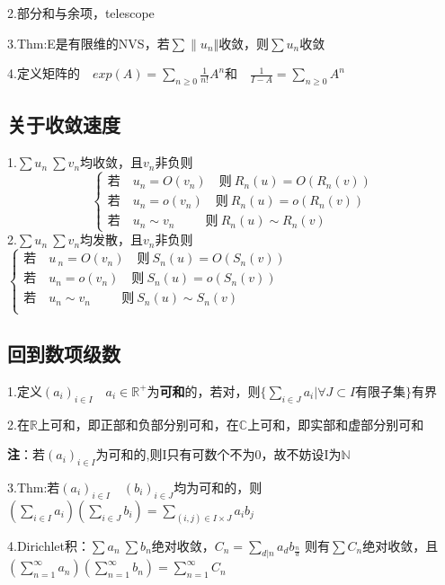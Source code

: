 \documentclass[hyperfer,UTF8,a4paper,12pt]{article}
\theoremstyle{plain}
\begin{document}
    2.部分和与余项，telescope

    3.Thm:E是有限维的NVS，若$\sum\|u_n\Vert$收敛，则$ \sum u_n $收敛

    4.定义矩阵的$\quad exp(A)=\sum\limits_{n\ge 0} \frac{1}{n!}A^n$和$\quad \frac{1}{I-A}=\sum\limits_{n\ge 0}A^n $


\subsection{关于收敛速度}
1.$ \sum u_n\ \sum v_n $均收敛，且$ v_n $非负则
\[\begin{cases}
 \textrm{若}\quad u_n=O(v_n) \quad\textrm{则} \ R_n(u)=O(R_n(v))  \\

 \textrm{若}\quad u_n=o(v_n) \quad\textrm{则} \ R_n(u)=o(R_n(v)) \\

 \textrm{若}\quad u_n\sim v_n\ \ \qquad\textrm{则} \ R_n(u)\sim R_n(v)
\end{cases}
\]
2.$ \sum u_n\ \sum v_n $均发散，且$ v_n $非负则
$\begin{cases}
\textrm{若}\quad u\,_n=O(v_n)   \quad\textrm{则}  \ S_n(u)=O(S_n(v))\\
\textrm{若}\quad u_n=o(v_n)     \quad\textrm{则}  \ S_n(u)=o(S_n(v))\\
\textrm{若}\quad u_n\sim v_n\ \ \qquad\textrm{则} \ S_n(u)\sim S_n(v)\\
\end{cases}$

\subsection{回到数项级数}
1.定义$ (a_i)_{i\in I}\quad a_i\in \mathbb{R}^+ $为\textbf{可和}的，若对，则$ \{\sum\limits_{i\in J} a_i|\forall J\subset I\textrm{有限子集}\}$有界

2.在$ \mathbb{R} $上可和，即正部和负部分别可和，在$ \mathbb{C} $上可和，即实部和虚部分别可和

\textbf{注}：若$ (a_i)_{i\in I} $为可和的,则I只有可数个不为0，故不妨设I为$\mathbb{N}$

3.Thm:若$ (a_i)_{i\in I} \quad (b_i)_{i\in J} $均为可和的，则$ (\sum\limits_{i\in I} a_i )(\sum\limits_{i\in J} b_i )=\sum\limits_{(i,j)\in I\times J} a_ib_j $

4.Dirichlet积：$\sum a_n\ \sum b_n$绝对收敛，$ C_n=\sum\limits_{d|n} a_db_{\frac{n}{d}}$
则有$ \sum C_n $绝对收敛，且$ (\sum\limits_{n=1}^{\infty} a_n )
(\sum\limits_{n=1}^{\infty} b_n )=
\sum\limits_{n=1}^{\infty} C_n $
\end{document}

